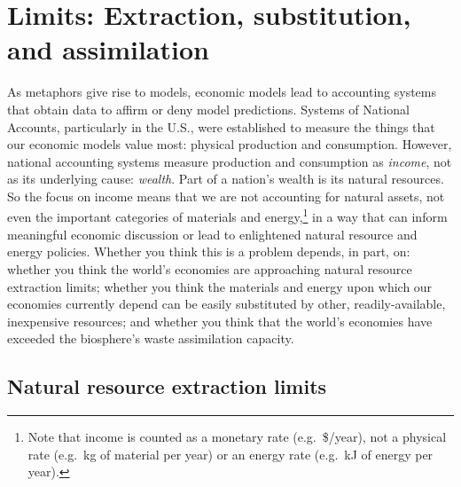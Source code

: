 \section{Limits: Extraction, substitution, and assimilation}
\label{sec:limits}

As metaphors give rise to models, 
economic models lead to accounting systems that obtain data
to affirm or deny model predictions.
Systems of National Accounts, 
particularly in the U.S., 
were established to measure the things that 
our economic models value most: 
physical production and consumption. 
However, national accounting systems measure production and consumption 
as \emph{income}, not as its underlying cause: \emph{wealth}.
Part of a nation's wealth is its natural resources.
So the focus on income means that we are not accounting for natural assets, 
not even the important categories of materials and energy,\footnote{Note that
	income is counted as a monetary rate (e.g.\ \$/year), 
	not a physical rate (e.g.\ kg of material per year)
	or an energy rate (e.g.\ kJ of energy per year).
	} 
in a way that can inform meaningful economic discussion or
lead to enlightened natural resource and energy policies.
Whether you think this is a problem depends, in part, on:
whether you think the world's economies are approaching 
	natural resource extraction limits;
whether you think the materials and energy upon which our economies currently depend
	can be easily substituted by other, readily-available, inexpensive resources; and
whether you think that the world's economies have exceeded 
	the biosphere's waste assimilation capacity.


\subsection{Natural resource extraction limits}
\label{sub:natural_resource_extraction_limits}

